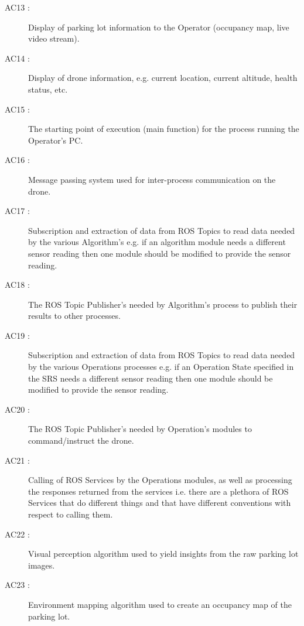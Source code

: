 \documentclass[12pt, titlepage]{article}
\begin{document}
\begin{description}
 \item[AC13 \label{AC_UserInterface2}:] 
Display of parking lot information to the Operator (occupancy map, live video stream). 

 \item[AC14 \label{AC_UserInterface3}:] 
Display of drone information, e.g. current location, current altitude, health status, etc.

 \item[AC15 \label{AC_MainInterfaceModule1}:] 
The starting point of execution (main function) for the process running the Operator's PC. 

 \item[AC16 \label{AC_ROS1}:] 
Message passing system used for inter-process communication on the drone. 

 \item[AC17 \label{AC_AlgorithmTopicInterface1}:] 
Subscription and extraction of data from ROS Topics to read   data needed by the various Algorithm's e.g. if an algorithm module needs a different sensor reading then one module should be modified to provide the sensor reading.

 \item[AC18 \label{AC_AlgorithmTopicInterface2}:] 
The ROS Topic Publisher's needed by Algorithm's process to publish their results to other processes.

 \item[AC19 \label{AC_DDCTopicInterface1}:] 
Subscription and extraction of data from ROS Topics to read   data needed by the various Operations processes e.g. if an Operation State specified in the SRS needs a different sensor reading then one module should be modified to provide the sensor reading.
 
 \item[AC20 \label{AC_DDCTopicInterface2}:] 
The ROS Topic Publisher's needed by Operation's modules to command/instruct the drone.

 \item[AC21 \label{AC_DDCServiceInterface1}:] 
Calling of ROS Services by the Operations modules, as well as processing the responses returned from the services i.e. there are a plethora of ROS Services that do different things and that have different conventions with respect to calling them.

 \item[AC22 \label{AC_VisionApp1}:] 
Visual perception algorithm used to yield insights from the raw parking lot images.

 \item[AC23 \label{AC_MappingApp1}:] 
Environment mapping algorithm used to create an occupancy map of the parking lot.


\end{description}
\end{document}

